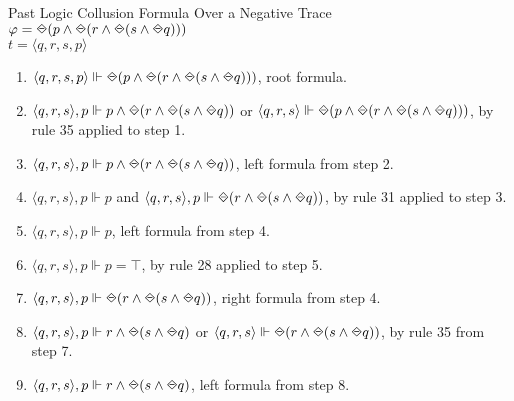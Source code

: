 \begin{myEx} Past Logic Collusion Formula Over a Negative Trace\\

$\varphi = \LTLonce(p \land \LTLonce(r \land \LTLonce(s \land \LTLonce q)))$\\
\indent$t = \langle q, r, s, p \rangle$\\

\begin{enumerate}
\item $\langle q, r, s, p \rangle \Vdash \LTLonce(p \land \LTLonce(r \land \LTLonce(s \land \LTLonce q)))$, root formula.\\ %

\item $\langle q, r, s \rangle, p \Vdash p \land \LTLonce(r \land \LTLonce(s \land \LTLonce q))$ or $\langle q, r, s \rangle \Vdash \LTLonce(p \land \LTLonce(r \land \LTLonce(s \land \LTLonce q)))$, by rule 35 applied to step 1.\\ %

\item $\langle q, r, s \rangle, p \Vdash p \land \LTLonce(r \land \LTLonce(s \land \LTLonce q))$, left formula from step 2.\\ %

\item $\langle q, r, s \rangle, p \Vdash p$ and $\langle q, r, s \rangle, p \Vdash \LTLonce(r \land \LTLonce(s \land \LTLonce q))$, by rule 31 applied to step 3.\\ %

\item $\langle q, r, s \rangle, p \Vdash p$, left formula from step 4.\\ %

\item $\langle q, r, s \rangle, p \Vdash p = \top$, by rule 28 applied to step 5.\\ %

\item $\langle q, r, s \rangle, p \Vdash \LTLonce(r \land \LTLonce(s \land \LTLonce q))$, right formula from step 4.\\ %

\item $\langle q, r, s \rangle, p \Vdash r \land \LTLonce(s \land \LTLonce q)$ or $\langle q, r, s \rangle \Vdash \LTLonce(r \land \LTLonce(s \land \LTLonce q))$, by rule 35 from step 7.\\ %

\item $\langle q, r, s \rangle, p \Vdash r \land \LTLonce(s \land \LTLonce q)$, left formula from step 8.\\ %


\end{enumerate}
\end{myEx}
